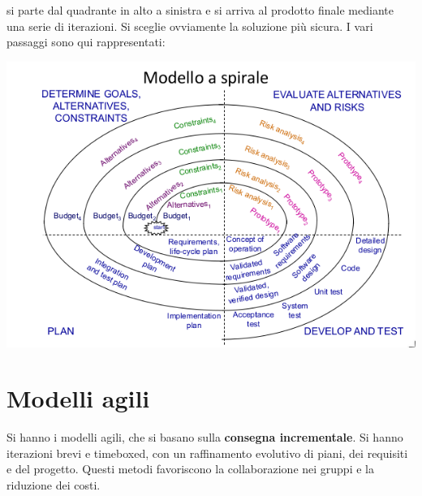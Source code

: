 \documentclass[a4paper,12pt, oneside]{book}
\begin{document}
si parte dal quadrante in alto a sinistra e si arriva al prodotto finale mediante una serie di iterazioni. Si sceglie ovviamente la soluzione più sicura. I vari passaggi sono qui rappresentati:
\begin{center}
\includegraphics[scale=0.7]{img/ms3.png}
\end{center}
\section{Modelli agili}
Si hanno i modelli agili, che si basano sulla \textbf{consegna incrementale}. Si hanno iterazioni brevi e timeboxed, con un raffinamento evolutivo di piani, dei requisiti e del progetto. Questi metodi favoriscono la collaborazione nei gruppi e la riduzione dei costi.
\end{document}
